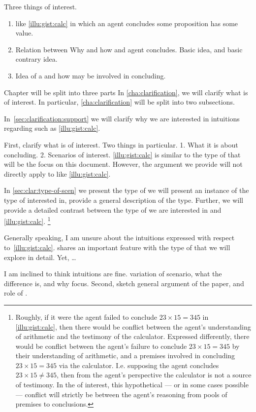 \begin{note}
  Three things of interest.

  \begin{enumerate}
  \item
     like \autoref{illu:gist:calc} in which an agent concludes some proposition has some value.
  \item
    Relation between Why and how and agent concludes.
    Basic idea, and basic contrary idea.
  \item
    Idea of a \fc{} and how  may be involved in concluding.
  \end{enumerate}


  Chapter will be split into three parts
  In \autoref{cha:clarification}, we will clarify what is of interest.
  In particular, \autoref{cha:clarification} will be split into two subsections.

  In~\autoref{sec:clarification:support} we will clarify why we are interested in intuitions regarding  such as \autoref{illu:gist:calc}.


  First, clarify what is of interest.
  Two things in particular.
  1. What it is about concluding.
  2. Scenarios of interest.
  \autoref{illu:gist:calc} is similar to the type of  that will be the focus on this document.
  However, the argument we provide will not directly apply to  like \autoref{illu:gist:calc}.

  In \autoref{sec:clar:type-of-scen} we present the type of  we will present an instance of the type of  interested in, provide a general description of the  type.
  Further, we will provide a detailed contrast between the type of  we are interested in and \autoref{illu:gist:calc}.%
  \footnote{
    Roughly, if it were the agent failed to conclude \(23 \times 15 = 345\) in \autoref{illu:gist:calc}, then there would be conflict between the agent's understanding of arithmetic and the testimony of the calculator.
    Expressed differently, there would be conflict between the agent's failure to conclude \(23 \times 15 = 345\) by their understanding of arithmetic, and a premises involved in concluding \(23 \times 15 = 345\) via the calculator.
    I.e. supposing the agent concludes \(23 \times 15 \ne 345\), then from the agent's perspective the calculator is not a source of testimony.
    In the  of interest, this hypothetical --- or in some cases possible --- conflict will strictly be between the agent's reasoning from pools of premises to conclusions.
  }

  Generally speaking, I am unsure about the intuitions expressed with respect to~\autoref{illu:gist:calc}.
   shares an important feature with the type of  that we will explore in detail.
  Yet, \dots

  I am inclined to think intuitions are fine.
  variation of scenario, what the difference is, and why focus.
  Second, sketch general argument of the paper, and role of .
\end{note}

